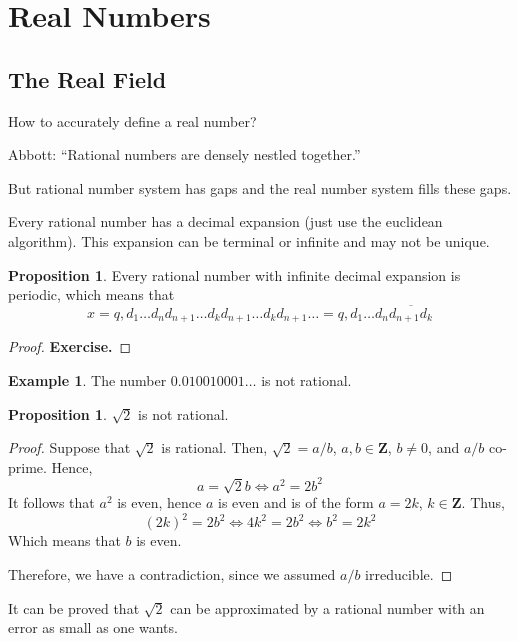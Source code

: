 \documentclass[tikz,12pt,a4paper]{article}
\theoremstyle{definition}
\newtheorem{proposition}[theorem]{Proposition}
\newtheorem{example}{Example}[section]
\begin{document}
\newpage
\section{Real Numbers}

\subsection{The Real Field}

How to accurately define a real number?

Abbott: ``Rational numbers are densely nestled together.''

But rational number system has gaps and the real number system fills
these gaps.

Every rational number has a decimal expansion (just use the euclidean algorithm). This expansion can be terminal or infinite and may not be unique.

\begin{proposition}
	Every rational number with infinite decimal expansion is periodic, which means that \[ x = q, d_1 \ldots d_n d_{n+1} \ldots d_k d_{n+1} \ldots d_k d_{n+1} \ldots = q, d_1 \ldots d_n \overline{d_{n+1} d_k} \]
\end{proposition}

\begin{proof}
	\textbf{Exercise.}
\end{proof}

\begin{example}
	The number $0.010010001 \ldots$ is not rational.
\end{example}

\begin{proposition}
	$\sqrt{2}$ is not rational.
\end{proposition}

\begin{proof}
	Suppose that $\sqrt{2}$ is rational. Then, $\sqrt{2} = a/b$, $a, b \in \textbf{Z}$, $b \neq 0$, and $a/b$ co-prime. Hence,
	\[ a = \sqrt{2} b \iff a^2 = 2b^2 \]
	It follows that $a^2$ is even, hence $a$ is even and is of the form $a = 2k$, $k \in \textbf{Z}$. Thus,
	\[ (2k)^2 = 2b^2 \iff 4k^2 = 2b^2 \iff b^2 = 2k^2 \]
	Which means that $b$ is even. 
	
	Therefore, we have a contradiction, since we assumed $a/b$ irreducible.
\end{proof}

It can be proved that $\sqrt{2}$ can be approximated by a rational number with an error as small as one wants. 
\end{document}
